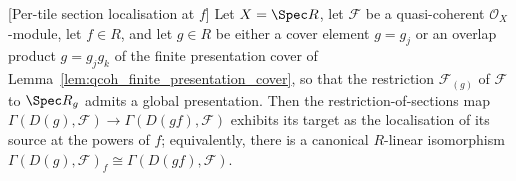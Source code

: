 \begin{lemma}

[Per-tile section localisation at \(f\)]
  \label{lem:tile_section_localization}
  Let \(X = \Spec R\), let \(\mathcal{F}\) be a quasi-coherent \(\mathcal{O}_X\)-module, let \(f \in R\),
  and let \(g \in R\) be either a cover element \(g = g_j\) or an overlap product \(g = g_j g_k\) of the
  finite presentation cover of Lemma~\ref{lem:qcoh_finite_presentation_cover}, so that the restriction \(\mathcal{F}_{(g)}\) of
  \(\mathcal{F}\) to \(\Spec R_g\) admits a global presentation. Then the restriction-of-sections map
  \(\Gamma(D(g), \mathcal{F}) \to \Gamma(D(gf), \mathcal{F})\) exhibits its target as the localisation of
  its source at the powers of \(f\); equivalently, there is a canonical \(R\)-linear isomorphism
  \(\Gamma(D(g), \mathcal{F})_f \cong \Gamma(D(gf), \mathcal{F})\).
\end{lemma}
